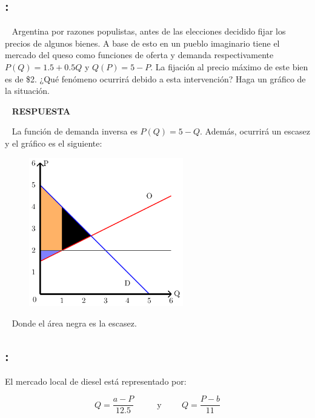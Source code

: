 \documentclass[
  letterpaper,
  DIV=11,
  numbers=noendperiod]{scrreport}
\begin{document}
\hypertarget{section-10}{%
\subsection{:}\label{section-10}}

~ Argentina por razones populistas, antes de las elecciones decidido
fijar los precios de algunos bienes. A base de esto en un pueblo
imaginario tiene el mercado del queso como funciones de oferta y demanda
respectivamente \(P(Q)=1.5+0.5Q\) y \(Q(P)=5-P\). La fijación al precio
máximo de este bien es de \$2. ¿Qué fenómeno ocurrirá debido a esta
intervención? Haga un gráfico de la situación.

~ \textbf{RESPUESTA}

~ La función de demanda inversa es \(P(Q)=5-Q\). Además, ocurrirá un
escasez y el gráfico es el siguiente:

\begin{figure}

{\centering \includegraphics[width=0.6\textwidth,height=\textheight]{7,8titulo_files/figure-pdf/unnamed-chunk-12-1.pdf}

}

\end{figure}

~ Donde el área negra es la escasez.

\hypertarget{section-11}{%
\subsection{:}\label{section-11}}

El mercado local de diesel está representado por:

\[Q = \frac{a-P}{12.5}  \hspace{1cm} \text{ y}   \hspace{1cm}   Q = \frac{P-b}{11}\]
\end{document}
